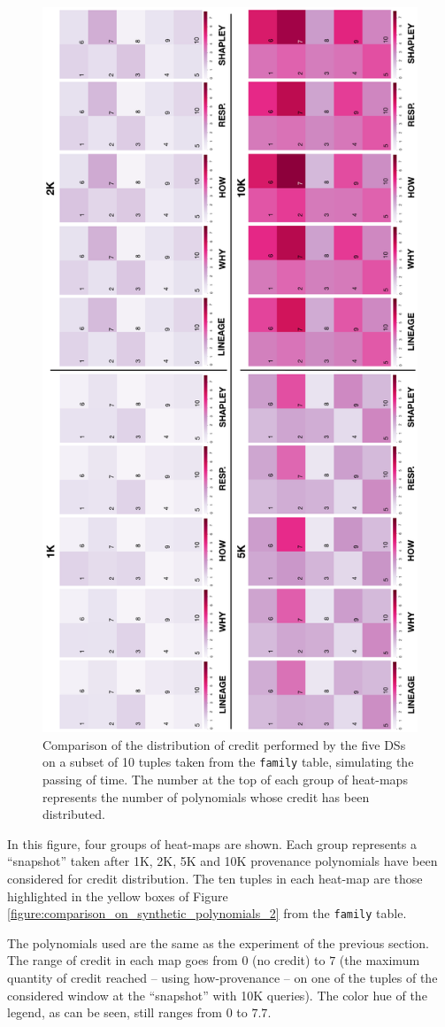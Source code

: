 \documentclass[preprint,12pt,sort&compress]{elsarticle}
\newcommand{\rone}[1]{\textcolor{reviewer1}{#1}}
\newcommand{\rtwo}[1]{\textcolor{reviewer2}{#1}}
\begin{document}
\begin{figure}[h!]
\centering
  \includegraphics[width=.60\textwidth]{comparison}
  \caption{\rtwo{Comparison of the distribution of credit performed by the \rtwo{five} DSs on a subset of 10 tuples taken from the \texttt{family} table, simulating the passing of time. The number at the top of each group of heat-maps represents the number of polynomials whose credit has been distributed.}}
  \label{fig:comparison}
\end{figure}

In this figure, four groups of heat-maps are shown. Each group represents a ``snapshot'' taken %
after 1K, 2K, 5K and 10K provenance polynomials have been considered for credit distribution.  
The ten tuples in each heat-map  %
are those  highlighted in the \rone{yellow} boxes of Figure \ref{figure:comparison_on_synthetic_polynomials_2} from the \texttt{family} table.  


The polynomials used are the same as the experiment of the previous section. The range of credit in each map goes from 0 (no credit) to $7$ (the maximum quantity of credit reached -- using how-provenance -- on one of the tuples of the considered window at the ``snapshot'' with 10K queries). The color hue of the legend, as can be seen, still ranges from $0$ to $7.7$.
\end{document}
